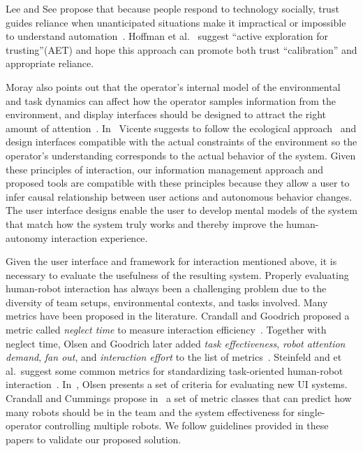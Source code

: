 Lee and See propose that because people respond to technology socially, trust guides reliance when unanticipated situations make it impractical or impossible to understand automation~\cite{Lee2004Trust}. Hoffman et al.\ \cite{Hoffman2013Trust} suggest ``active exploration for trusting''(AET) and hope this approach can promote both trust ``calibration'' and appropriate reliance. 

Moray also points out that the operator's internal model of the environmental and task dynamics can affect how the operator samples information from the environment, and display interfaces should be designed to attract the right amount of attention~\cite{Moray1990Designing}. In~\cite{Vicente1997Should} Vicente suggests to follow the ecological approach~\cite{Rasmussen1994Cognitive} and design interfaces compatible with the actual constraints of the environment so the operator's understanding corresponds to the actual behavior of the system. Given these principles of interaction, our information management approach and proposed tools are compatible with these principles because they allow a user to infer causal relationship between user actions and autonomous behavior changes. The user interface designs enable the user to develop mental models of the system that match how the system truly works and thereby improve the human-autonomy interaction experience.

Given the user interface and framework for interaction mentioned above, it is necessary to evaluate the usefulness of the resulting system. Properly evaluating human-robot interaction has always been a challenging problem due to the diversity of team setups, environmental contexts, and tasks involved. Many metrics have been proposed in the literature. Crandall and Goodrich proposed a metric called \textit{neglect time} to measure interaction efficiency~\cite{Crandall2002Principles}. Together with neglect time, Olsen and Goodrich later added \textit{task effectiveness}, \textit{robot attention demand}, \textit{fan out}, and \textit{interaction effort} to the list of metrics~\cite{Olsen2003Metrics}. Steinfeld and et al.\ suggest some common metrics for standardizing task-oriented human-robot interaction~\cite{Steinfeld2006Common}. In~\cite{Olsen2007Evaluating}, Olsen presents a set of criteria for evaluating new UI systems. Crandall and Cummings propose in~\cite{Crandall2007Ddentifying} a set of metric classes that can predict how many robots should be in the team and the system effectiveness for single-operator controlling multiple robots. We follow guidelines provided in these papers to validate our proposed solution.


